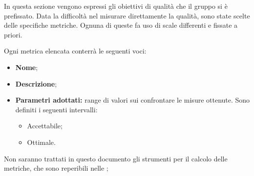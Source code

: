 In questa sezione vengono espressi gli obiettivi di qualità che il gruppo \gruppo \space  si è prefissato. Data la difficoltà nel misurare direttamente la qualità, sono state scelte delle specifiche metriche. Ognuna di queste fa uso di scale differenti e fissate a
priori.

Ogni metrica elencata conterrà le seguenti voci:
\begin{itemize}
	\item \textbf{Nome};
	\item \textbf{Descrizione};
	\item \textbf{Parametri adottati: }range di valori sui confrontare le misure ottenute. Sono definiti i seguenti intervalli:
	\begin{itemize}
		\item Accettabile;
		\item Ottimale.
	\end{itemize}		
	
\end{itemize}

Non saranno trattati in questo documento gli strumenti per il calcolo delle metriche, che sono reperibili nelle \NdP ;

